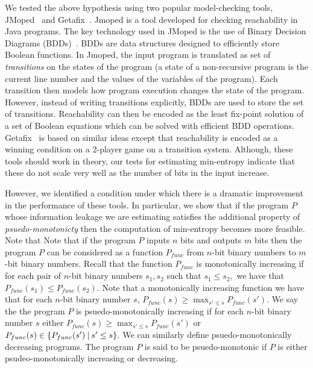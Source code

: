 We tested the above  hypothesis using two popular model-checking tools, JMoped~\cite{Jmoped} and Getafix~\cite{getafix}. 
Jmoped is a tool developed for checking reachability in Java programs. The key technology used in JMoped is the use of Binary Decision Diagrams (BDDs)~\cite{}. BDDs are data structures designed to efficiently   store Boolean functions. In Jmoped, the input program is translated  as set of \emph{transitions} on the states of the program (a state of a non-recursive program is the current line number and the values of the variables of the program). Each transition  then models how program execution changes the state of the program.  However, instead of writing transitions explicitly,
BDDs are used to store the set of transitions.  Reachability can then be encoded as  the least fix-point solution of a set of Boolean equations which can be solved with efficient BDD operations. Getafix~\cite{} is based on similar ideas except that reachability is encoded as a winning condition on a 2-player game on a  transition system. 
Although, these tools should work in theory, our tests for estimating min-entropy indicate that these do not scale very well  as the number of bits in the input increase. 


However, we  identified a condition under which there is a dramatic improvement in the performance of these tools. In particular, we show that if the program $P$ whose information leakage we are estimating satisfies the additional property of \emph{psuedo-monotonicty} then the computation of min-entropy becomes more feasible. Note that  
  Note that if the program $P$ inputs $n$ bits and outputs $m$ bits then the program $P$ can be considered as  a function $P_{func}$ from $n$-bit binary numbers to $m$-bit binary numbers. Recall that the function $P_{func}$ is monotonically increasing  if  for each pair of $n$-bit  binary numbers $s_1, s_2$  such that  $s_1\leq s_2,$ we have that $P_{func}(s_1) \leq P_{func}(s_2).$ Note that a monotonically increasing  function we have that for each $n$-bit binary number $s$, $P_{func}(s) \geq \max_{ s'\leq s} {P_{func}(s')}.$
    We say the the program $P$ is psuedo-monotonically increasing if for each $n$-bit  binary number $s$ either $P_{func}(s) \geq \max_{ s'\leq s}{P_{func}(s')}$ or $P_{func}(s) \in \{ P_{func}(s') \mathbin{|} s'\leq s \}.$ We can similarly define psuedo-monotonically decreasing programs. The program $P$ is said to be psuedo-monotonic if $P$ is either 
    psudeo-monotonically increasing or decreasing. 

